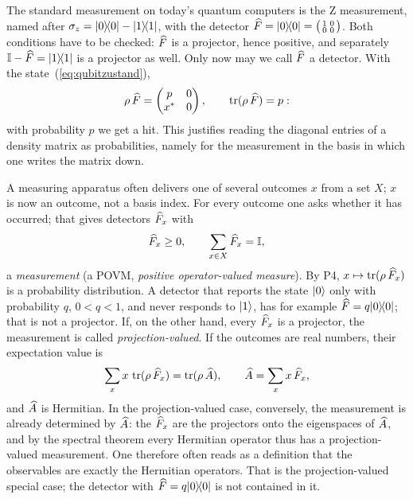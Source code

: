\begin{example}
The standard measurement on today's quantum computers is the Z measurement, named after $\sigma_{z} = \lvert 0 \rangle\!\langle 0 \rvert - \lvert 1 \rangle\!\langle 1 \rvert$, with the detector $\widehat{F} = \lvert 0 \rangle\!\langle 0 \rvert = \bigl(\begin{smallmatrix} 1 & 0 \\ 0 & 0\end{smallmatrix}\bigr)$. Both conditions have to be checked: $\widehat{F}$ is a projector, hence positive, and separately $\mathbb{I}-\widehat{F} = \lvert 1 \rangle\!\langle 1 \rvert$ is a projector as well. Only now may we call $\widehat{F}$ a detector. With the state~(\ref{eq:qubitzustand}),
\begin{equation}
	\rho\,\widehat{F} = \begin{pmatrix} p & 0 \\ x^* & 0\end{pmatrix}, \qquad \operatorname{tr}(\rho\,\widehat{F}) = p:
\end{equation}
with probability $p$ we get a hit. This justifies reading the diagonal entries of a density matrix as probabilities, namely for the measurement in the basis in which one writes the matrix down.
\end{example}

A measuring apparatus often delivers one of several outcomes $x$ from a set $X$; $x$ is now an outcome, not a basis index. For every outcome one asks whether it has occurred; that gives detectors $\widehat{F}_x$ with
\begin{equation}
	\widehat{F}_x \geq 0, \qquad \sum_{x\in X}\widehat{F}_x = \mathbb{I},
\end{equation}
a \emph{measurement} (a POVM, \emph{positive operator-valued measure}). By P4, $x\mapsto\operatorname{tr}(\rho\,\widehat{F}_x)$ is a probability distribution. A detector that reports the state $\lvert 0 \rangle$ only with probability $q$, $0 < q < 1$, and never responds to $\lvert 1 \rangle$, has for example $\widehat{F} = q\lvert 0 \rangle\!\langle 0 \rvert$; that is not a projector. If, on the other hand, every $\widehat{F}_x$ is a projector, the measurement is called \emph{projection-valued}. If the outcomes are real numbers, their expectation value is
\begin{equation}\label{eq:observableA}
	\sum_x x\,\operatorname{tr}(\rho\,\widehat{F}_x) = \operatorname{tr}(\rho\,\widehat{A}), \qquad \widehat{A} = \sum_x x\,\widehat{F}_x,
\end{equation}
and $\widehat{A}$ is Hermitian. In the projection-valued case, conversely, the measurement is already determined by $\widehat{A}$: the $\widehat{F}_x$ are the projectors onto the eigenspaces of $\widehat{A}$, and by the spectral theorem every Hermitian operator thus has a projection-valued measurement. One therefore often reads as a definition that the observables are exactly the Hermitian operators. That is the projection-valued special case; the detector with $\widehat{F} = q\lvert 0 \rangle\!\langle 0 \rvert$ is not contained in it.

